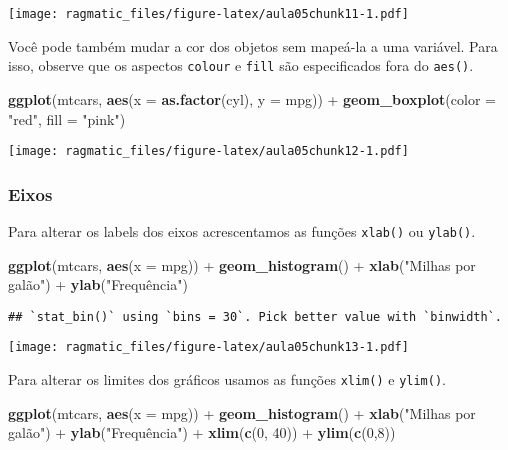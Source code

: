 \documentclass[]{book}
\newenvironment{Shaded}{\begin{snugshade}}{\end{snugshade}}
\newcommand{\KeywordTok}[1]{\textcolor[rgb]{0.13,0.29,0.53}{\textbf{{#1}}}}
\newcommand{\DataTypeTok}[1]{\textcolor[rgb]{0.13,0.29,0.53}{{#1}}}
\newcommand{\DecValTok}[1]{\textcolor[rgb]{0.00,0.00,0.81}{{#1}}}
\newcommand{\StringTok}[1]{\textcolor[rgb]{0.31,0.60,0.02}{{#1}}}
\newcommand{\NormalTok}[1]{{#1}}
\begin{document}
\texttt{[image: ragmatic\_files/figure-latex/aula05chunk11-1.pdf]}

Você pode também mudar a cor dos objetos sem mapeá-la a uma variável.
Para isso, observe que os aspectos \texttt{colour} e \texttt{fill} são
especificados fora do \texttt{aes()}.

\begin{Shaded}
\begin{Highlighting}[]
\KeywordTok{ggplot}\NormalTok{(mtcars, }\KeywordTok{aes}\NormalTok{(}\DataTypeTok{x =} \KeywordTok{as.factor}\NormalTok{(cyl), }\DataTypeTok{y =} \NormalTok{mpg)) +}\StringTok{ }
\StringTok{  }\KeywordTok{geom_boxplot}\NormalTok{(}\DataTypeTok{color =} \StringTok{"red"}\NormalTok{, }\DataTypeTok{fill =} \StringTok{"pink"}\NormalTok{)}
\end{Highlighting}
\end{Shaded}

\texttt{[image: ragmatic\_files/figure-latex/aula05chunk12-1.pdf]}

\subsubsection{Eixos}\label{eixos}

Para alterar os labels dos eixos acrescentamos as funções
\texttt{xlab()} ou \texttt{ylab()}.

\begin{Shaded}
\begin{Highlighting}[]
\KeywordTok{ggplot}\NormalTok{(mtcars, }\KeywordTok{aes}\NormalTok{(}\DataTypeTok{x =} \NormalTok{mpg)) +}\StringTok{ }
\StringTok{  }\KeywordTok{geom_histogram}\NormalTok{() +}
\StringTok{  }\KeywordTok{xlab}\NormalTok{(}\StringTok{"Milhas por galão"}\NormalTok{) +}
\StringTok{  }\KeywordTok{ylab}\NormalTok{(}\StringTok{"Frequência"}\NormalTok{)}
\end{Highlighting}
\end{Shaded}

\begin{verbatim}
## `stat_bin()` using `bins = 30`. Pick better value with `binwidth`.
\end{verbatim}

\texttt{[image: ragmatic\_files/figure-latex/aula05chunk13-1.pdf]}

Para alterar os limites dos gráficos usamos as funções \texttt{xlim()} e
\texttt{ylim()}.

\begin{Shaded}
\begin{Highlighting}[]
\KeywordTok{ggplot}\NormalTok{(mtcars, }\KeywordTok{aes}\NormalTok{(}\DataTypeTok{x =} \NormalTok{mpg)) +}\StringTok{ }
\StringTok{  }\KeywordTok{geom_histogram}\NormalTok{() +}
\StringTok{  }\KeywordTok{xlab}\NormalTok{(}\StringTok{"Milhas por galão"}\NormalTok{) +}
\StringTok{  }\KeywordTok{ylab}\NormalTok{(}\StringTok{"Frequência"}\NormalTok{) +}
\StringTok{  }\KeywordTok{xlim}\NormalTok{(}\KeywordTok{c}\NormalTok{(}\DecValTok{0}\NormalTok{, }\DecValTok{40}\NormalTok{)) +}
\StringTok{  }\KeywordTok{ylim}\NormalTok{(}\KeywordTok{c}\NormalTok{(}\DecValTok{0}\NormalTok{,}\DecValTok{8}\NormalTok{))}
\end{Highlighting}
\end{Shaded}
\end{document}
